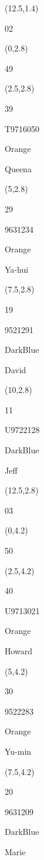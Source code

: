 \documentclass[a4paper]{article}
\newcommand{\myseat}[4]{%
\vspace{-0.1cm}
\parbox[t][2.2cm][t]{3.5cm}{
\small #1 %
\begin{description}
\vspace{-0.1cm}
\item [ID:] #2
\vspace{-0.1cm}
\item [Team:] #3 \normalsize
\vspace{-0.1cm}
\item \normalsize #4
\vspace{-0.1cm}
\end{description}
}
}
\begin{document}
\begin{CJK}{UTF8}{cyberbit}
\begin{textblock}{2.5}(12.5,1.4)
\textblockcolor{}
	\myseat{02}{}{}{}
\end{textblock}

\begin{textblock}{2.5}(0,2.8)
\textblockcolor{}
	\myseat{49}{}{}{}
\end{textblock}

\begin{textblock}{2.5}(2.5,2.8)
	\myseat{39}{T9716050}{Orange}{Queena}
\end{textblock}

\begin{textblock}{2.5}(5,2.8)
	\myseat{29}{9631234}{Orange}{Ya-hui}
\end{textblock}

\begin{textblock}{2.5}(7.5,2.8)
	\myseat{19}{9521291}{DarkBlue}{David}
\end{textblock}

\begin{textblock}{2.5}(10,2.8)
	\myseat{11}{U9722128}{DarkBlue}{Jeff}
\end{textblock}

\begin{textblock}{2.5}(12.5,2.8)
\textblockcolor{}
	\myseat{03}{}{}{}
\end{textblock}

\begin{textblock}{2.5}(0,4.2)
\textblockcolor{}
	\myseat{50}{}{}{}
\end{textblock}

\begin{textblock}{2.5}(2.5,4.2)
	\myseat{40}{U9713021}{Orange}{Howard}
\end{textblock}

\begin{textblock}{2.5}(5,4.2)
	\myseat{30}{9522283}{Orange}{Yu-min}
\end{textblock}

\begin{textblock}{2.5}(7.5,4.2)
	\myseat{20}{9631209}{DarkBlue}{Marie}
\end{textblock}


\end{CJK}
\end{document}
